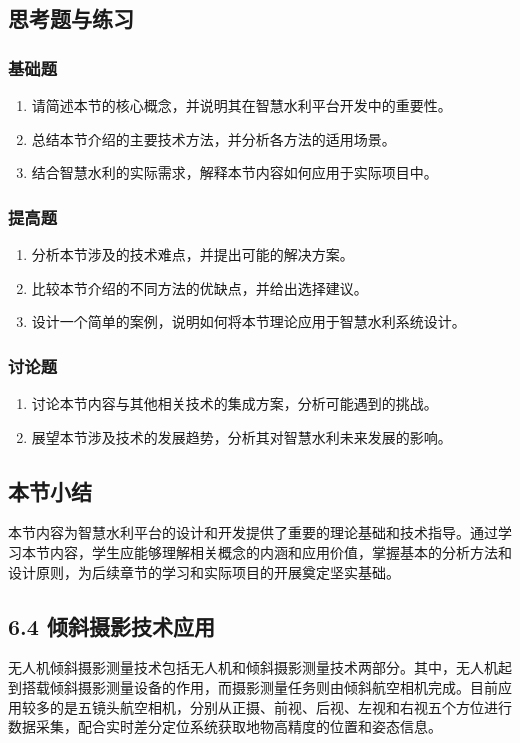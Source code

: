 \subsection{思考题与练习}\label{ux601dux8003ux9898ux4e0eux7ec3ux4e60-4} \subsubsection{基础题}\label{ux57faux7840ux9898-4}
\begin{enumerate} \def\labelenumi{\arabic{enumi}.} \tightlist \item 请简述本节的核心概念，并说明其在智慧水利平台开发中的重要性。 \item
总结本节介绍的主要技术方法，并分析各方法的适用场景。 \item 结合智慧水利的实际需求，解释本节内容如何应用于实际项目中。 \end{enumerate}
\subsubsection{提高题}\label{ux63d0ux9ad8ux9898-4} \begin{enumerate} \def\labelenumi{\arabic{enumi}.} \tightlist \item
分析本节涉及的技术难点，并提出可能的解决方案。 \item 比较本节介绍的不同方法的优缺点，并给出选择建议。 \item 设计一个简单的案例，说明如何将本节理论应用于智慧水利系统设计。 \end{enumerate}
\subsubsection{讨论题}\label{ux8ba8ux8bbaux9898-4} \begin{enumerate} \def\labelenumi{\arabic{enumi}.} \tightlist \item
讨论本节内容与其他相关技术的集成方案，分析可能遇到的挑战。 \item 展望本节涉及技术的发展趋势，分析其对智慧水利未来发展的影响。 \end{enumerate}
\subsection{本节小结}\label{ux672cux8282ux5c0fux7ed3-3}
本节内容为智慧水利平台的设计和开发提供了重要的理论基础和技术指导。通过学习本节内容，学生应能够理解相关概念的内涵和应用价值，掌握基本的分析方法和设计原则，为后续章节的学习和实际项目的开展奠定坚实基础。 \subsection{6.4
倾斜摄影技术应用}\label{ux503eux659cux6444ux5f71ux6280ux672fux5e94ux7528}
无人机倾斜摄影测量技术包括无人机和倾斜摄影测量技术两部分。其中，无人机起到搭载倾斜摄影测量设备的作用，而摄影测量任务则由倾斜航空相机完成。目前应用较多的是五镜头航空相机，分别从正摄、前视、后视、左视和右视五个方位进行数据采集，配合实时差分定位系统获取地物高精度的位置和姿态信息。
